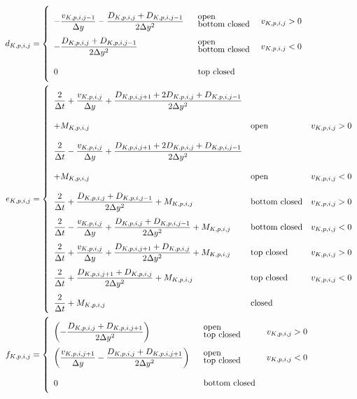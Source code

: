  \begin{align}
   \label{eq:matrix-elements-lowerdiag-y}
   d_{K,p,i,j} &= \left\lbrace
     \renewcommand{\arraystretch}{2.5}
     \begin{array}{lll}
       -\dfrac{v_{K,p,i,j-1}}{\Delta y}
       -\dfrac{D_{K,p,i,j}+D_{K,p,i,j-1}}{2\Delta y^2}
       &\mbox{\minitab{open}{bottom closed}} & v_{K,p,i,j} > 0 \\
       -\dfrac{D_{K,p,i,j}+D_{K,p,i,j-1}}{2\Delta y^2}
       &\mbox{\minitab{open}{bottom closed}} & v_{K,p,i,j} < 0\\
       0 & \mbox{\minitab{top closed}{}} & 
     \end{array}
     \right.
     \\
     \label{eq:matrix-elements-diag-y}
     e_{K,p,i,j} &=
     \left\lbrace
     \renewcommand{\arraystretch}{2.5}
     \begin{array}{lll}
       \dfrac{2}{\Delta t} 
       +\dfrac{v_{K,p,i,j}}{\Delta y}
       +\dfrac{D_{K,p,i,j+1}+2D_{K,p,i,j}+D_{K,p,i,j-1}}{2\Delta y^2}\\
       + M_{K,p,i,j}    
       &\mbox{open} & v_{K,p,i,j} > 0 \\
       \dfrac{2}{\Delta t} 
       -\dfrac{v_{K,p,i,j}}{\Delta y}
       +\dfrac{D_{K,p,i,j+1}+2D_{K,p,i,j}+D_{K,p,i,j-1}}{2\Delta y^2}\\
       + M_{K,p,i,j}    
       &\mbox{open} & v_{K,p,i,j} < 0\\
       \dfrac{2}{\Delta t} 
       +\dfrac{D_{K,p,i,j}+D_{K,p,i,j-1}}{2\Delta y^2}
       + M_{K,p,i,j}    
       & \mbox{bottom closed} & v_{K,p,i,j} > 0\\
       \dfrac{2}{\Delta t} 
       -\dfrac{v_{K,p,i,j}}{\Delta y}
       +\dfrac{D_{K,p,i,j}+D_{K,p,i,j-1}}{2\Delta y^2}
       + M_{K,p,i,j}    
       & \mbox{bottom closed} & v_{K,p,i,j} < 0\\
         \dfrac{2}{\Delta t} 
         +\dfrac{v_{K,p,i,j}}{\Delta y}
         +\dfrac{D_{K,p,i,j+1}+D_{K,p,i,j}}{2\Delta y^2}
         + M_{K,p,i,j}    
       &\mbox{top closed} & v_{K,p,i,j} > 0\\
         \dfrac{2}{\Delta t} 
         +\dfrac{D_{K,p,i,j+1}+D_{K,p,i,j}}{2\Delta y^2}
         + M_{K,p,i,j}    
       &\mbox{top closed} & v_{K,p,i,j} < 0\\
       \dfrac{2}{\Delta t} + M_{K,p,i,j}
       &  \mbox{closed}
     \end{array}
   \right.
   \\
   \label{eq:matrix-elements-upperdiag-y}
   f_{K,p,i,j} &=
     \left\lbrace
     \renewcommand{\arraystretch}{2.5}
     \begin{array}{lll}
        \left(
      -\dfrac{D_{K,p,i,j}+D_{K,p,i,j+1}}{2\Delta y^2}
    \right) 
       &\mbox{\minitab{open}{top closed}} & v_{K,p,i,j} > 0 \\
       \left(
         \dfrac{v_{K,p,i,j+1}}{\Delta y}
         -\dfrac{D_{K,p,i,j}+D_{K,p,i,j+1}}{2\Delta y^2}
       \right) 
       &\mbox{\minitab{open}{top closed}} & v_{K,p,i,j} < 0\\
       0 & \mbox{\minitab{bottom closed}{}} & 
     \end{array}
   \right.
 \end{align}

